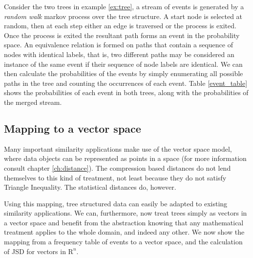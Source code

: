 Consider the two trees in example \ref{ex:tree}, a stream of events is generated by a \textit{random walk} markov process over the tree structure.  A start node is selected at random, then at each step either an edge is traversed or the process is exited. Once the process is exited the resultant path forms an event in the probability space. An equivalence relation is formed on paths that contain a sequence of nodes with identical labels, that is, two different paths may be considered an instance of the same event if their sequence of node labels are identical.  We can then calculate the probabilities of the events by simply enumerating all possible paths in the tree and counting the occurrences of each event.  Table \ref{event_table} shows the probabilities of each event in both trees, along with the probabilities of the merged stream.

\subsection{Mapping to a vector space}\label{vector_space}
Many important similarity applications make use of the vector space model, where data objects can be represented as points in a space (for more information consult chapter \ref{ch:distance}).  The compression based distances do not lend themselves to this kind of treatment, not least because they do not satisfy Triangle Inequality.  The statistical distances do, however.

Using this mapping, tree structured data can easily be adapted to existing similarity applications.  We can, furthermore, now treat trees simply as vectors in a vector space and benefit from the abstraction knowing that any mathematical treatment applies to the whole domain, and indeed any other.  We now show the mapping from a frequency table of events to a vector space, and the calculation of JSD for vectors in $\mathrm{R}^n$.

